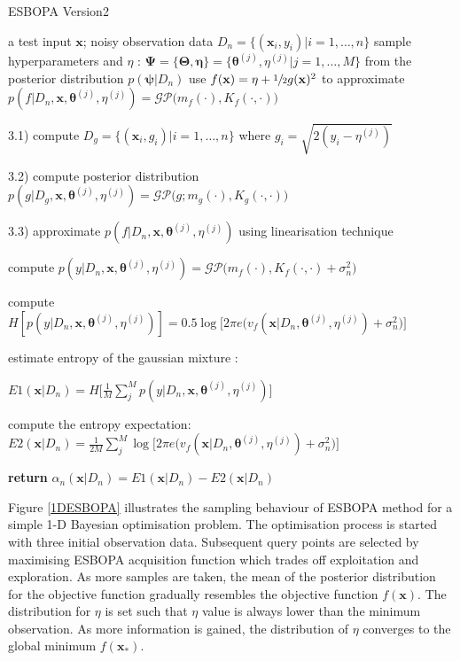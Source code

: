 \documentclass[a4paper,11pt]{report}
\begin{document}
\begin{algorithm}
\caption{ESBOPA Version2 }\label{ESBOPA }
\begin{algorithmic}[1]
\INPUT a test input $\mathbf{x}$; noisy observation data $D_n=\{(\mathbf{x}_{i},y_{i}) \vert i=1, \dots, n\}$
\Statex
	\State sample hyperparameters and $\eta$ : $\boldsymbol{\Psi}=\{\boldsymbol{\Theta}, \boldsymbol{\eta}\}= \{\boldsymbol{\theta}^{(j)},\eta^{(j)} \vert j=1, \dots, M\}$ from the posterior distribution $p(\boldsymbol{\psi} \vert D_n)$
	\State use $f(\mathbf{x}) =\eta+\sfrac{1}{2}g(\mathbf{x})^2 $ to approximate $p(f \vert D_n,\mathbf{x},\boldsymbol{\theta}^{(j)}, \eta^{(j)})= \mathcal{GP} \big(m_f(\cdot),K_f(\cdot,\cdot)\big ) $
	
	3.1) compute $D_g=\{(\mathbf{x}_{i},g_{i}) \vert i=1, \dots, n\} $ where $g_{i}=\sqrt {2(y_{i}-\eta^{(j)})}$
	
	3.2) compute posterior distribution $ p(g \vert  D_g, \mathbf{x}, \boldsymbol{\theta}^{(j)},\eta^{(j)})=\mathcal{GP} \big (g; m_{g}(\cdot),K_{g}(\cdot,\cdot) \big)$
	
	3.3) approximate $p(f \vert D_n,\mathbf{x},\boldsymbol{\theta}^{(j)}, \eta^{(j)})$ using linearisation technique 
	
	\State compute $p(y \vert D_n,\mathbf{x},\boldsymbol{\theta}^{(j)}, \eta^{(j)}) =  \mathcal{GP} \big (m_f(\cdot),K_f(\cdot,\cdot)+ \sigma_n^2 \big)$
	
	\State compute $ H[p(y \vert D_n,\mathbf{x},\boldsymbol{\theta}^{(j)}, \eta^{(j)})] =0.5 \log \big[2\pi e \big (v_f(\mathbf{x} \vert D_n, \boldsymbol{\theta}^{(j)}, \eta^{(j)})+\sigma_n^2\big ) \big ] $
	
	\EndFor	
			
	\State estimate entropy of the gaussian mixture : 
	
	$ E1(\mathbf{x} \vert D_n) = H \Big[  \frac{1}{M} \sum_j^{M} p(y \vert D_n,\mathbf{x},\boldsymbol{\theta}^{(j)}, \eta^{(j)}) \Big] $
	
	\State compute the entropy expectation: $ E2(\mathbf{x} \vert D_n)= \frac{1}{2M} \sum_j^{M} \log \big[ 2\pi e \big(v_f(\mathbf{x} \vert D_n, \boldsymbol{\theta}^{(j)}, \eta^{(j)})+\sigma_n^2\big) \big] $ 	
	
	\State \textbf{return}  $\alpha_n(\mathbf{x} \vert D_n)=E1(\mathbf{x} \vert D_n)-E2(\mathbf{x} \vert D_n)$
	
\end{algorithmic}
\end{algorithm}
\noindent
Figure \ref{1DESBOPA} illustrates the sampling behaviour of ESBOPA method for a simple 1-D Bayesian optimisation problem. The optimisation process is started with three initial observation data. Subsequent query points are selected by maximising ESBOPA acquisition function which trades off exploitation and exploration. As more samples are taken, the mean of the posterior distribution for the objective function gradually resembles the objective function $f(\mathbf{x})$. The distribution for $\eta$ is set such that $\eta$ value is always lower than the minimum observation. As more information is gained, the distribution of $\eta$ converges to the global minimum $f(\mathbf{x}_*)$.
\end{document}
